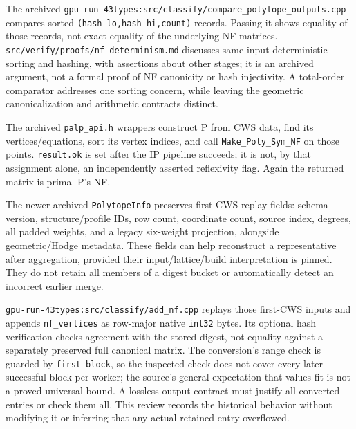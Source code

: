 \documentclass[11pt,a4paper,oneside]{report}
\begin{document}
The archived
\texttt{gpu-\allowbreak{}run-\allowbreak{}43types:\allowbreak{}src/\allowbreak{}classify\allowbreak{}/\allowbreak{}compare\_\allowbreak{}polytope\allowbreak{}\_\allowbreak{}outputs.\allowbreak{}cpp}
compares sorted
\texttt{(\allowbreak{}hash\_\allowbreak{}lo,\allowbreak{}hash\_\allowbreak{}hi,\allowbreak{}count)}
records. Passing it shows equality of those records, not exact equality
of the underlying NF matrices.
\texttt{src/\allowbreak{}verify/\allowbreak{}proofs/\allowbreak{}nf\_\allowbreak{}determin\allowbreak{}ism.\allowbreak{}md}
discusses same-input deterministic sorting and hashing, with assertions
about other stages; it is an archived argument, not a formal proof of NF
canonicity or hash injectivity. A total-order comparator addresses one
sorting concern, while leaving the geometric canonicalization and
arithmetic contracts distinct.

The archived \texttt{palp\_\allowbreak{}api.\allowbreak{}h} wrappers
construct P from CWS data, find its vertices/equations, sort its vertex
indices, and call
\texttt{Make\_\allowbreak{}Poly\_\allowbreak{}Sym\_\allowbreak{}NF} on
those points. \texttt{result.\allowbreak{}ok} is set after the IP
pipeline succeeds; it is not, by that assignment alone, an independently
asserted reflexivity flag. Again the returned matrix is primal P's NF.

The newer archived \texttt{Polytope\allowbreak{}Info} preserves
first-CWS replay fields: schema version, structure/profile IDs, row
count, coordinate count, source index, degrees, all padded weights, and
a legacy six-weight projection, alongside geometric/Hodge metadata.
These fields can help reconstruct a representative after aggregation,
provided their input/lattice/build interpretation is pinned. They do not
retain all members of a digest bucket or automatically detect an
incorrect earlier merge.

\texttt{gpu-\allowbreak{}run-\allowbreak{}43types:\allowbreak{}src/\allowbreak{}classify\allowbreak{}/\allowbreak{}add\_\allowbreak{}nf.\allowbreak{}cpp}
replays those first-CWS inputs and appends
\texttt{nf\_\allowbreak{}vertices} as row-major native \texttt{int32}
bytes. Its optional hash verification checks agreement with the stored
digest, not equality against a separately preserved full canonical
matrix. The conversion's range check is guarded by
\texttt{first\_\allowbreak{}block}, so the inspected check does not
cover every later successful block per worker; the source's general
expectation that values fit is not a proved universal bound. A lossless
output contract must justify all converted entries or check them all.
This review records the historical behavior without modifying it or
inferring that any actual retained entry overflowed.
\end{document}

